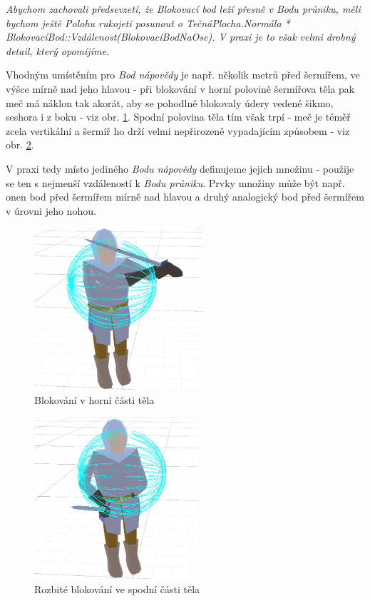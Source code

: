 \textit{Abychom zachovali předsevzetí, že \textit{Blokovací bod} leží přesně v \textit{Bodu průniku}, měli bychom ještě \textit{Polohu rukojeti} posunout o \textit{TečnáPlocha.Normála * BlokovacíBod::Vzdálenost(BlokovacíBodNaOse)}. V praxi je to však velmi drobný detail, který opomíjíme.}

Vhodným umístěním pro \textit{Bod nápovědy} je např. několik metrů před šermířem, ve výšce mírně nad jeho hlavou - při blokování v horní polovině šermířova těla pak meč má náklon tak akorát, aby se pohodlně blokovaly údery vedené šikmo, seshora i z boku - viz obr. \ref{obr04:blockingGood}. Spodní polovina těla tím však trpí - meč je téměř zcela vertikální a šermíř ho drží velmi nepřirozeně vypadajícím způsobem - viz obr. \ref{obr04:blockingBad}. 
 
V praxi tedy místo jediného \textit{Bodu nápovědy} definujeme jejich množinu - použije se ten s nejmenší vzdáleností k \textit{Bodu průniku}. Prvky množiny může být např. onen bod před šermířem mírně nad hlavou a druhý analogický bod před šermířem v úrovni jeho nohou.  

\begin{figure}[ht]\centering
    \center
    \includegraphics[height=60mm]{../img/blocking-good.png}
    \caption{Blokování v horní části těla}
    \label{obr04:blockingGood}
\end{figure} 

\begin{figure}[ht]\centering
    \center
    \includegraphics[height=60mm]{../img/blocking-bad.png}
    \caption{Rozbité blokování ve spodní části těla}
    \label{obr04:blockingBad}
\end{figure} 


